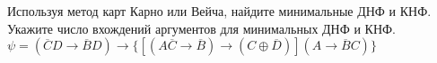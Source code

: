 \question Используя метод карт Карно или Вейча, найдите минимальные ДНФ и КНФ. Укажите число вхождений аргументов для минимальных ДНФ и КНФ.
$\psi = (\overline{C}D \rightarrow \overline{B}D) \rightarrow \{[ (A\overline{C} \rightarrow \overline{B}) \rightarrow (C \oplus \overline{D})](A \rightarrow \overline{B}C)\}$
